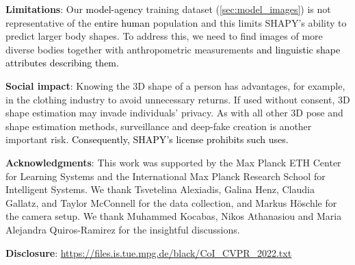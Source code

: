 \documentclass[10pt,twocolumn,letterpaper]{article}
\newcommand{\qheading}[1]{\noindent\textbf{#1}:}
\newcommand{\modelCOLOR}{black}
\newcommand{\modelname}{{\color{\modelCOLOR}SHAPY}\xspace}
\newcommand{\threeD}{3D\xspace}
\newcommand{\cameraready}[1]{\textcolor{Fuchsia}{{#1}}\xspace}
\renewcommand{\cameraready}[1]{\textcolor{black}{{#1}}\xspace}
\newcommand{\colorTERM}{blue}
\renewcommand{\colorTERM}{black}
\newcommand{\measurements}[0]{{\color{\colorTERM}anthropometric measurements}\xspace}
\newcommand{\linguisticshapeattributes}[0]{{\color{\colorTERM}linguistic shape attributes}\xspace}
\begin{document}
 
\pagebreak

\qheading{Limitations}
Our \cameraready{model-agency} training dataset (\cref{sec:model_images}) is not representative of the \cameraready{entire human} population and this
limits \modelname's ability to predict larger body shapes. To address this,
we need to find images of more diverse bodies together with \measurements
\cameraready{and \linguisticshapeattributes describing them.}

\qheading{Social impact}
Knowing the \threeD shape of a person has advantages, for example, in the clothing industry to avoid unnecessary returns. If used without consent, \threeD shape estimation may invade individuals' privacy.
As with all other \threeD pose and shape estimation methods, surveillance
and deep-fake creation is another important risk. 
\cameraready{Consequently, \modelname's license prohibits such uses.}



{\qheading{Acknowledgments}
This work was supported by the
Max Planck ETH Center for Learning Systems and the 
International Max Planck Research School for Intelligent Systems.
We thank Tsvetelina Alexiadis, Galina Henz, Claudia Gallatz, and Taylor McConnell for the data collection, and Markus H{\"o}schle for the camera setup. 
We thank Muhammed Kocabas, Nikos Athanasiou and Maria Alejandra Quiros-Ramirez for the insightful 
discussions.}

{\small
\qheading{Disclosure}
\href{https://files.is.tue.mpg.de/black/CoI_CVPR_2022.txt}{
     https://files.is.tue.mpg.de/black/{CoI\_CVPR\_2022.txt}}}


\pagebreak

 
\clearpage

{\small
    
    
}

\clearpage
\end{document}
